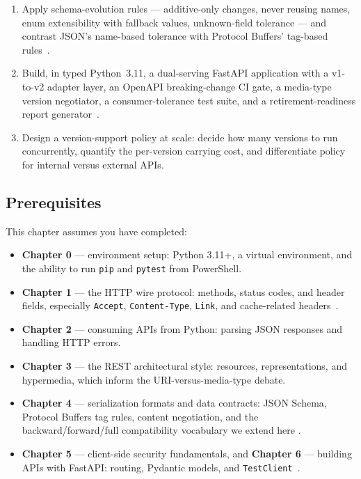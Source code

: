 \begin{enumerate}[label=\textbf{LO-\arabic*.}, leftmargin=2.6cm]
  \item Apply schema-evolution rules --- additive-only changes, never reusing
        names, enum extensibility with fallback values, unknown-field
        tolerance --- and contrast JSON's name-based tolerance with Protocol
        Buffers' tag-based rules~\cite{protobufdocs}.
  \item Build, in typed Python~3.11, a dual-serving FastAPI application with a
        v1-to-v2 adapter layer, an OpenAPI breaking-change CI gate, a
        media-type version negotiator, a consumer-tolerance test suite, and a
        retirement-readiness report generator~\cite{fastapidocs,openapi31}.
  \item Design a version-support policy at scale: decide how many versions to
        run concurrently, quantify the per-version carrying cost, and
        differentiate policy for internal versus external APIs.
\end{enumerate}

\subsection*{Prerequisites}
This chapter assumes you have completed:

\begin{itemize}
  \item \textbf{Chapter 0} --- environment setup: Python 3.11+, a virtual
        environment, and the ability to run \texttt{pip} and \texttt{pytest}
        from PowerShell.
  \item \textbf{Chapter 1} --- the HTTP wire protocol: methods, status codes,
        and header fields, especially \texttt{Accept}, \texttt{Content-Type},
        \texttt{Link}, and cache-related headers~\cite{rfc9110}.
  \item \textbf{Chapter 2} --- consuming APIs from Python: parsing JSON
        responses and handling HTTP errors.
  \item \textbf{Chapter 3} --- the REST architectural style: resources,
        representations, and hypermedia, which inform the
        URI-versus-media-type debate.
  \item \textbf{Chapter 4} --- serialization formats and data contracts:
        JSON Schema, Protocol Buffers tag rules, content negotiation, and the
        backward/forward/full compatibility vocabulary we extend here
        \cite{protobufdocs}.
  \item \textbf{Chapter 5} --- client-side security fundamentals, and
        \textbf{Chapter 6} --- building APIs with FastAPI: routing, Pydantic
        models, and \texttt{TestClient}~\cite{fastapidocs}.
\end{itemize}

